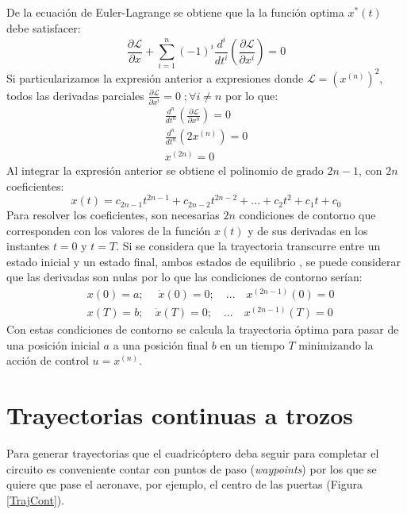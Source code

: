 De la  ecuación de Euler-Lagrange se obtiene que la la función optima $x^*(t)$ debe satisfacer:
\begin{equation}
	\frac{\partial\mathcal{L}}{\partial x} + \sum_{i=1}^{n}(-1)^i \frac{d^i}{dt^i}\left(\frac{\partial\mathcal{L}}{\partial x^i}\right)  = 0
\end{equation}
Si particularizamos la expresión anterior a expresiones donde $\mathcal{L} =\left(x^{(n)}\right)^2$, todos las derivadas parciales $\frac{\partial\mathcal{L}}{\partial x^i} = 0 \; ; \forall i \neq n$ por lo que:
\begin{align}
	\frac{d^n}{dt^n}\left(\frac{\partial\mathcal{L}}{\partial x^n}\right) = 0 \\
	\frac{d^n}{dt^n}\left(2 x^{(n)}\right) = 0\\
	x^{(2n)} = 0
\end{align}
Al integrar la expresión anterior se obtiene el polinomio de grado $2n-1$, con $2n$ coeficientes:
\begin{equation}
	x(t) = c_{2n-1}t^{2n-1} + c_{2n-2}t^{2n-2} + ... + c_2t^2 + c_1t + c_0
\end{equation}
Para resolver los coeficientes, son necesarias $2n$ condiciones de contorno que corresponden con los valores de la función $x(t)$ y de sus derivadas en los instantes $t=0$ y $t = T$. Si se considera que la trayectoria transcurre entre un estado inicial y un estado final, ambos estados de equilibrio , se puede considerar que las derivadas son nulas por lo que las condiciones de contorno serían:
\begin{align}
 	&x(0) = a; \quad \;\dot{x}(0) = 0;  \quad...\quad x^{(2n-1)}(0) = 0\\
	&x(T) = b;\quad \dot{x}(T) = 0;  \quad...\quad x^{(2n-1)}(T) = 0
\end{align}
Con estas condiciones de contorno se calcula la trayectoria óptima para pasar de una posición inicial $a$ a una posición final $b$ en un tiempo $T$ minimizando la acción de control $u = x^{(n)}$. 



\section{Trayectorias continuas a trozos}
Para generar trayectorias que el cuadricóptero deba seguir para completar el circuito es conveniente contar con puntos de paso (\textit{waypoints}) por los que se quiere que pase el aeronave, por ejemplo, el centro de las puertas (Figura \ref{TrajCont}).


